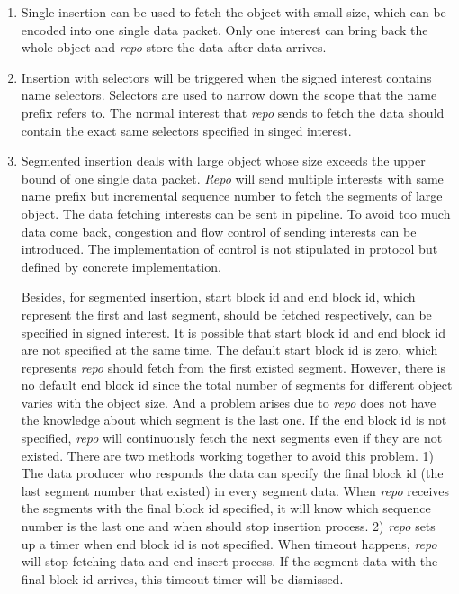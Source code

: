 \documentclass[conference]{IEEEtran}
\begin{document}
\begin{enumerate}
\item Single insertion can be used to fetch the object with small size, which can be encoded into one single data packet. Only one interest can bring back the whole object and \emph{repo} store the data after data arrives.
\item Insertion with selectors will be triggered when the signed interest contains name selectors. Selectors are used to narrow down the scope that the name prefix refers to. The normal interest that \emph{repo} sends to fetch the data should contain the exact same selectors specified in singed interest.
\item Segmented insertion deals with large object whose size exceeds the upper bound of one single data packet. \emph{Repo} will send multiple interests with same name prefix but incremental sequence number to fetch the segments of large object. The data fetching interests can be sent in pipeline. To avoid too much data come back, congestion and flow control of sending interests can be introduced. The implementation of control is not stipulated in protocol but defined by concrete implementation.

    Besides, for segmented insertion, start block id and end block id, which represent the first and last segment, should be fetched respectively, can be specified in signed interest. It is possible that start block id and end block id are not specified at the same time. The default start block id is zero, which represents \emph{repo} should fetch from the first existed segment. However, there is no default end block id since the total number of segments for different object varies with the object size. And a problem arises due to \emph{repo} does not have the knowledge about which segment is the last one. If the end block id is not specified, \emph{repo} will continuously fetch the next segments even if they are not existed. There are two methods working together to avoid this problem. 1) The data producer who responds the data can specify the final block id (the last segment number that existed) in every segment data. When \emph{repo} receives the segments with the final block id specified, it will know which sequence number is the last one and when should stop insertion process. 2) \emph{repo} sets up a timer when end block id is not specified. When timeout happens, \emph{repo} will stop fetching data and end insert process. If the segment data with the final block id arrives, this timeout timer will be dismissed.
\end{enumerate}
\end{document}
